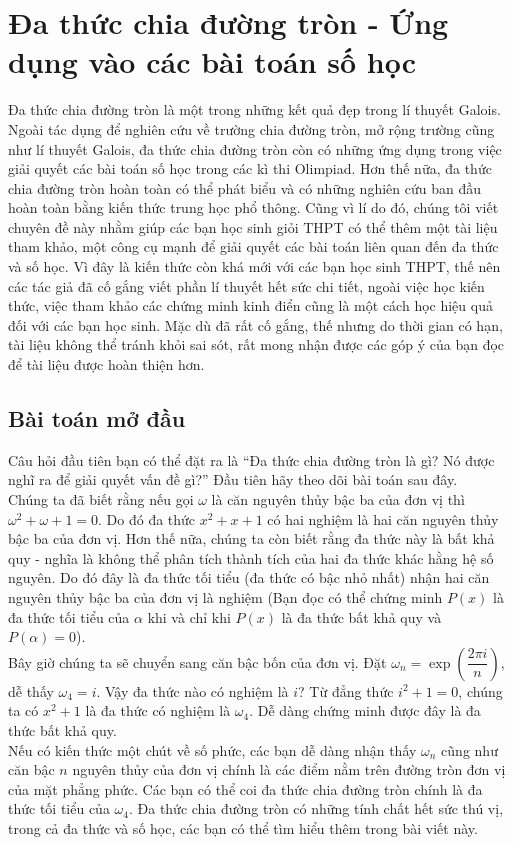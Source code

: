 
	
\section{Đa thức chia đường tròn - Ứng dụng vào các bài toán số học}
\noindent Đa thức chia đường tròn là một trong những kết quả đẹp trong lí thuyết Galois. Ngoài tác dụng
để nghiên cứu về trường chia đường tròn, mở rộng trường cũng như lí thuyết Galois, đa thức
chia đường tròn còn có những ứng dụng trong việc giải quyết các bài toán số học trong các kì
thi Olimpiad. Hơn thế nữa, đa thức chia đường tròn hoàn toàn có thể phát biểu và có những
nghiên cứu ban đầu hoàn toàn bằng kiến thức trung học phổ thông. Cũng vì lí do đó, chúng tôi
viết chuyên đề này nhằm giúp các bạn học sinh giỏi THPT có thể thêm một tài liệu tham khảo,
một công cụ mạnh để giải quyết các bài toán liên quan đến đa thức và số học. Vì đây là kiến
thức còn khá mới với các bạn học sinh THPT, thế nên các tác giả đã cố gắng viết phần lí thuyết
hết sức chi tiết, ngoài việc học kiến thức, việc tham khảo các chứng minh kinh điển cũng là một
cách học hiệu quả đối với các bạn học sinh. Mặc dù đã rất cố gắng, thế nhưng do thời gian có
hạn, tài liệu không thể tránh khỏi sai sót, rất mong nhận được các góp ý của bạn đọc để tài liệu
được  hoàn  thiện  hơn.


\subsection{Bài toán mở đầu}	
\noindent Câu hỏi đầu tiên bạn có thể đặt ra là ``Đa thức chia đường tròn là gì? Nó được nghĩ ra để giải
quyết vấn đề gì?'' Đầu tiên hãy theo dõi bài toán sau đây.\\
Chúng ta đã biết rằng nếu gọi $\omega $ là căn nguyên thủy bậc ba của đơn vị thì $\omega ^2 + \omega  + 1 = 0$. Do đó
đa thức $x^2+x+1$ có hai nghiệm là hai căn nguyên thủy bậc ba của đơn vị. Hơn thế nữa, chúng
ta còn biết rằng đa thức này là bất khả quy - nghĩa là không thể phân tích thành tích của hai đa
thức khác hằng hệ số nguyên. Do đó đây là đa thức tối tiểu (đa thức có bậc nhỏ nhất) nhận hai
căn nguyên thủy bậc ba của đơn vị là nghiệm (Bạn đọc có thể chứng minh $P(x)$ là đa thức tối
tiểu của $\alpha$ khi và chỉ khi $P(x)$ là đa thức bất khả quy và $P(\alpha)=0$).\\
Bây giờ chúng ta sẽ chuyển sang căn bậc bốn của đơn vị. Đặt $\omega _n = \exp\left( \dfrac{{2\pi i}}{n} \right)$, dễ thấy $\omega_4=i$.
Vậy đa thức nào có nghiệm là $i$? Từ đẳng thức $i^2
+ 1 = 0$, chúng ta có $x^2
+ 1$ là đa thức có nghiệm là $\omega_4$. 
Dễ dàng chứng minh được đây là đa thức bất khả quy.\\
Nếu có kiến thức một chút về số phức, các bạn dễ dàng nhận thấy  $\omega_n$ cũng như căn bậc $n$
nguyên thủy của đơn vị chính là các điểm nằm trên đường tròn đơn vị của mặt phẳng phức. Các
bạn có thể coi đa thức chia đường tròn chính là đa thức tối tiểu của  $\omega_4$. Đa thức chia đường tròn
có những tính chất hết sức thú vị, trong cả đa thức và số học, các bạn có thể tìm hiểu thêm trong
bài viết này.


